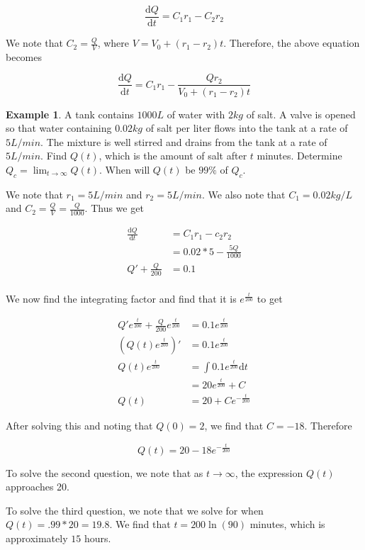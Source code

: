 \documentclass[11pt]{article}
\theoremstyle{plain} %
\theoremstyle{definition}
\theoremstyle{example}
\newtheorem*{example}{Example}
\theoremstyle{remark}
\begin{document}
$$\frac{\mathrm d Q}{\mathrm d t} = C_1r_1 - C_2r_2$$

We note that $C_2 = \frac{Q}{V}$, where $V = V_0 + (r_1-r_2)t$. Therefore, the above equation becomes

$$\frac{\mathrm d Q}{\mathrm d t} = C_1r_1 - \frac{Qr_2}{V_0+(r_1-r_2)t}$$

\begin{example}
A tank contains $1000L$ of water with $2kg$ of salt. A valve is opened so that water containing $0.02kg$ of salt per liter flows into the tank at a rate of $5L/min$. The mixture is well stirred and drains from the tank at a rate of $5L/min$. Find $Q(t)$, which is the amount of salt after $t$ minutes. Determine $Q_c = \lim_{t \rightarrow \infty}Q(t)$. When will $Q(t)$ be $99\%$ of $Q_c$.
\end{example}

We note that $r_1 = 5L/min$ and $r_2 = 5L/min$. We also note that $C_1 = 0.02kg/L$ and $C_2 = \frac{Q}{V}= \frac{Q}{1000}$. Thus we get 


\begin{align*}
	\frac{\mathrm d Q}{\mathrm d t} &= C_1r_1 - c_2r_2\\
	&= 0.02*5-\frac{5Q}{1000}\\
	Q' + \frac{Q}{200} &= 0.1\\
\end{align*}

We now find the integrating factor and find that it is $e^{\frac{t}{200}}$ to get

\begin{align*}
	Q' e^{\frac{t}{200}}+ \frac{Q}{200} e^{\frac{t}{200}}&= 0.1e^{\frac{t}{200}}\\
	\left(Q(t) e^{\frac{t}{200}}\right)'&= 0.1e^{\frac{t}{200}}\\
	Q(t)e^{\frac{t}{200}} &= \int 0.1e^{\frac{t}{200}} \mathrm d t\\
	&= 20e^{\frac{t}{200}} + C\\
	Q(t) &= 20+Ce^{-\frac{t}{200}}
\end{align*}

After solving this and noting that $Q(0) = 2$, we find that $C = -18$. Therefore

$$Q(t) = 20-18e^{-\frac{t}{200}}$$

To solve the second question, we note that as $t \rightarrow \infty$, the expression $Q(t)$ approaches 20.

To solve the third question, we note that we solve for when $Q(t) = .99*20 = 19.8$. We find that $t= 200\ln(90)$ minutes, which is approximately $15$ hours. 
\end{document}
